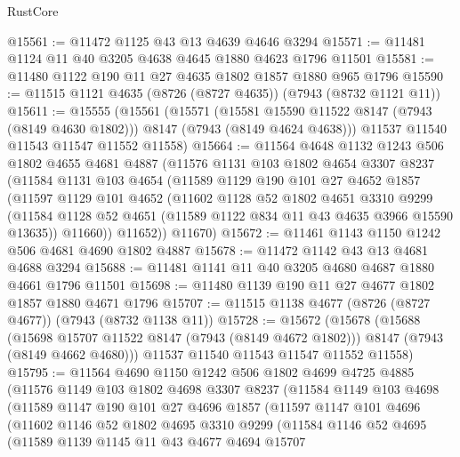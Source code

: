 \begin{lexlean}{RustCore}
\begin{coremodule}
@15561 := @11472 @1125 @43 @13 @4639 @4646 @3294
@15571 := @11481 @1124 @11 @40 @3205 @4638 @4645 @1880 @4623 @1796 @11501
@15581 := @11480 @1122 @190 @11 @27 @4635 @1802 @1857 @1880 @965 @1796
@15590 := @11515 @1121 @4635 (@8726 (@8727 @4635)) (@7943 (@8732 @1121 @11))
@15611 := @15555
    (@15561
      (@15571
        (@15581 @15590 @11522 @8147 (@7943 (@8149 @4630 @1802)))
        @8147
        (@7943 (@8149 @4624 @4638)))
      @11537
      @11540
      @11543
      @11547
      @11552
      @11558)
@15664 := @11564
    @4648
    @1132
    @1243
    @506
    @1802
    @4655
    @4681
    @4887
    (@11576
      @1131
      @103
      @1802
      @4654
      @3307
      @8237
      (@11584
        @1131
        @103
        @4654
        (@11589
          @1129
          @190
          @101
          @27
          @4652
          @1857
          (@11597
            @1129
            @101
            @4652
            (@11602
              @1128
              @52
              @1802
              @4651
              @3310
              @9299
              (@11584 @1128 @52 @4651 (@11589 @1122 @834 @11 @43 @4635 @3966 @15590 @13635))
              @11660))
          @11652))
      @11670)
@15672 := @11461 @1143 @1150 @1242 @506 @4681 @4690 @1802 @4887
@15678 := @11472 @1142 @43 @13 @4681 @4688 @3294
@15688 := @11481 @1141 @11 @40 @3205 @4680 @4687 @1880 @4661 @1796 @11501
@15698 := @11480 @1139 @190 @11 @27 @4677 @1802 @1857 @1880 @4671 @1796
@15707 := @11515 @1138 @4677 (@8726 (@8727 @4677)) (@7943 (@8732 @1138 @11))
@15728 := @15672
    (@15678
      (@15688
        (@15698 @15707 @11522 @8147 (@7943 (@8149 @4672 @1802)))
        @8147
        (@7943 (@8149 @4662 @4680)))
      @11537
      @11540
      @11543
      @11547
      @11552
      @11558)
@15795 := @11564
    @4690
    @1150
    @1242
    @506
    @1802
    @4699
    @4725
    @4885
    (@11576
      @1149
      @103
      @1802
      @4698
      @3307
      @8237
      (@11584
        @1149
        @103
        @4698
        (@11589
          @1147
          @190
          @101
          @27
          @4696
          @1857
          (@11597
            @1147
            @101
            @4696
            (@11602
              @1146
              @52
              @1802
              @4695
              @3310
              @9299
              (@11584
                @1146
                @52
                @4695
                (@11589
                  @1139
                  @1145
                  @11
                  @43
                  @4677
                  @4694
                  @15707

\end{coremodule}
\end{lexlean}
